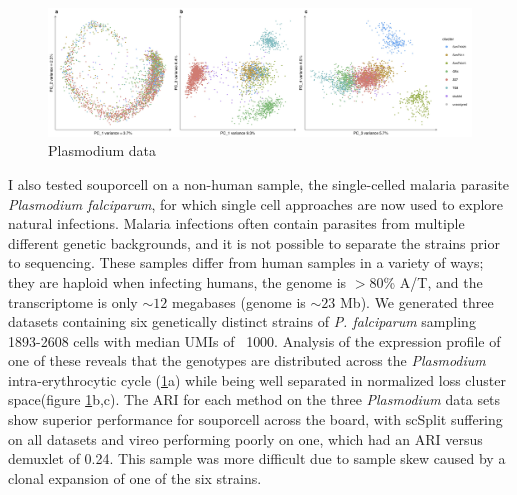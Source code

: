 \begin{figure}[htbp!]
\caption{Plasmodium data}
\label{figure:malaria}
\begin{centering}
\includegraphics[width=\textwidth]{malaria.jpg} 
\end{centering}
\end{figure}

\par{
I also tested souporcell on a non-human sample, the single-celled malaria parasite \textit{Plasmodium falciparum}, for which single cell approaches are now used to explore natural infections\cite{MCA}. Malaria infections often contain parasites from multiple different genetic backgrounds, and it is not possible to separate the strains prior to sequencing. These samples differ from human samples in a variety of ways; they are haploid when infecting humans, the genome is $>80$\% A/T, and the transcriptome is only $\sim12$ megabases (genome is $\sim23$ Mb). We generated three datasets containing six genetically distinct strains of \textit{P. falciparum} sampling 1893-2608 cells with median UMIs of ~1000. Analysis of the expression profile of one of these reveals that the genotypes are distributed across the \textit{Plasmodium} intra-erythrocytic cycle (\ref{figure:malaria}a) while being well separated in normalized loss cluster space(figure \ref{figure:malaria}b,c). The ARI for each method on the three \textit{Plasmodium} data sets show superior performance for souporcell across the board, with scSplit suffering on all datasets and vireo performing poorly on one, which had an ARI versus demuxlet of 0.24. This sample was more difficult due to sample skew caused by a clonal expansion of one of the six strains.
} 

